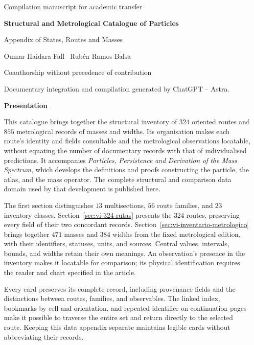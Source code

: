 \documentclass[a4paper,10pt]{article}
\begin{document}
\thispagestyle{empty}
\begin{center}
{\fontsize{8}{10}\selectfont Compilation manuscript for academic transfer\par}
\vspace{12mm}
{\fontsize{17}{20.5}\selectfont\bfseries Structural and Metrological Catalogue of Particles\par}
\vspace{6pt}
{\fontsize{11}{13.5}\selectfont Appendix of States, Routes and Masses\par}
\vspace{11pt}
{\fontsize{11.5}{14}\selectfont Oumar Haidara Fall \textperiodcentered\ Rubén Ramos Balsa\par}
\vspace{4pt}
{\fontsize{8}{10}\selectfont Coauthorship without precedence of contribution\par}
\vspace{3pt}
{\fontsize{7.5}{9.5}\selectfont Documentary integration and compilation generated by ChatGPT -- Astra.\par}
\end{center}
\vspace{7pt}
\begin{center}\bfseries Presentation\end{center}
\begingroup
\fontsize{10.5}{12.8}\selectfont
\setlength{\parskip}{2pt plus 1pt minus .5pt}
\noindent
\begin{minipage}{\textwidth}
This catalogue brings together the structural inventory of \(324\)
oriented routes and \(855\) metrological records of masses and widths.
Its organisation makes each route's identity and fields consultable and
the metrological observations locatable, without equating the number of documentary records
with that of individualised predictions. It accompanies \emph{Particles,
Persistence and Derivation of the Mass Spectrum}, which develops the
definitions and proofs constructing the particle, the atlas, and the
mass operator. The complete structural and comparison data domain used
by that development is published here.

The first section distinguishes \(13\) multisections, \(56\) route
families, and \(23\) inventory classes.
Section~\ref{sec:vi-324-rutas} presents the \(324\) routes, preserving
every field of their two concordant records.
Section~\ref{sec:vi-inventario-metrologico} brings together \(471\) masses
and \(384\) widths from the fixed metrological edition, with their
identifiers, statuses, units, and sources. Central values, intervals,
bounds, and widths retain their own meanings. An observation's presence
in the inventory makes it locatable for comparison; its physical
identification requires the reader and chart specified in the article.

Every card preserves its complete record, including provenance fields
and the distinctions between routes, families, and observables. The
linked index, bookmarks by cell and orientation, and repeated identifier
on continuation pages make it possible to traverse the entire set and
return directly to the selected route. Keeping this data appendix
separate maintains legible cards without abbreviating their records.\par
\end{minipage}
\par\endgroup
\clearpage
\tableofcontents
\clearpage


\end{document}
